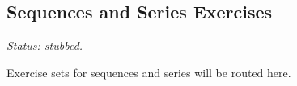 \subsection*{Sequences and Series Exercises}

\textit{Status: stubbed.}

Exercise sets for sequences and series will be routed here.
